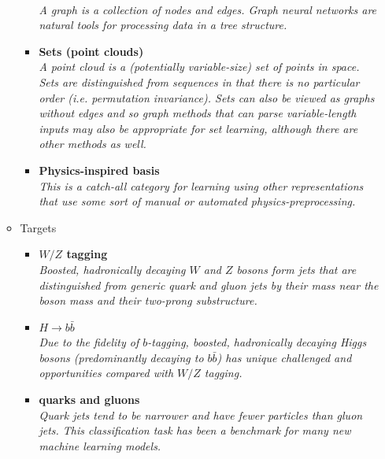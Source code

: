 \documentclass[12pt,letterpaper]{article}
\begin{document}
\begin{itemize}
\begin{itemize}
\begin{itemize}
				\\\textit{A graph is a collection of nodes and edges.  Graph neural networks are natural tools for processing data in a tree structure.}
				\item \textbf{Sets (point clouds)}~\cite{Komiske:2018cqr,Qu:2019gqs,Mikuni:2020wpr,Shlomi:2020ufi,Dolan:2020qkr,Fenton:2020woz,Lee:2020qil,collado2021learning,Mikuni:2021pou}
				\\\textit{A point cloud is a (potentially variable-size) set of points in space.  Sets are distinguished from sequences in that there is no particular order (i.e. permutation invariance).  Sets can also be viewed as graphs without edges and so graph methods that can parse variable-length inputs may also be appropriate for set learning, although there are other methods as well.}
				\item \textbf{Physics-inspired basis}~\cite{Datta:2019,Datta:2017rhs,Datta:2017lxt,Komiske:2017aww,Butter:2017cot,Grojean:2020ech}
				\\\textit{This is a catch-all category for learning using other representations that use some sort of manual or automated physics-preprocessing.}
			\end{itemize}
		\item Targets
			\begin{itemize}
			\item \textbf{$W/Z$ tagging}~\cite{deOliveira:2015xxd,Barnard:2016qma,Louppe:2017ipp,Sirunyan:2020lcu,Chen:2019uar,1811770,Dreyer:2020brq,Kim:2021gtv}
			\\\textit{Boosted, hadronically decaying $W$ and $Z$ bosons form jets that are distinguished from generic quark and gluon jets by their mass near the boson mass and their two-prong substructure.}
			\item \textbf{$H\rightarrow b\bar{b}$}~\cite{Datta:2019ndh,Lin:2018cin,Moreno:2019neq,Chakraborty:2019imr,Sirunyan:2020lcu,Chung:2020ysf,Tannenwald:2020mhq,guo2020boosted,Abbas:2020khd,Jang:2021eph}
			\\\textit{Due to the fidelity of $b$-tagging, boosted, hadronically decaying Higgs bosons (predominantly decaying to $b\bar{b}$) has unique challenged and opportunities compared with $W/Z$ tagging.}
			\item \textbf{quarks and gluons}~\cite{ATL-PHYS-PUB-2017-017,Komiske:2016rsd,Cheng:2017rdo,Stoye:DLPS2017,Chien:2018dfn,Moreno:2019bmu,Kasieczka:2018lwf,1806025,Lee:2019ssx,Lee:2019cad,Dreyer:2020brq,Romero:2021qlf}
			\\\textit{Quark jets tend to be narrower and have fewer particles than gluon jets.  This classification task has been a benchmark for many new machine learning models.}

\end{itemize}
\end{itemize}
\end{itemize}
\end{document}
